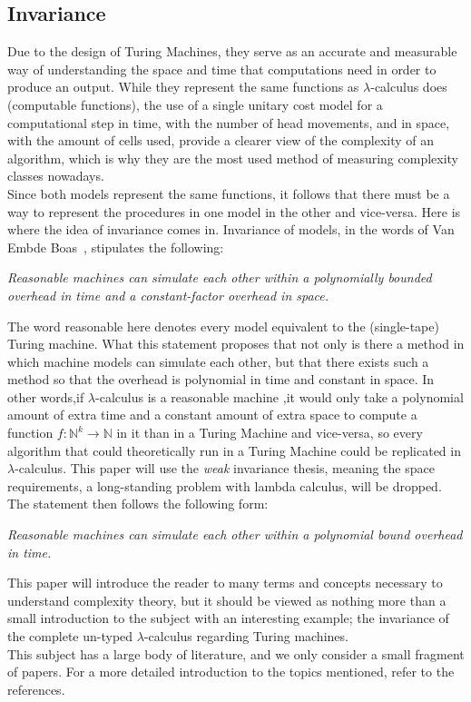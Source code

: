 \documentclass[11pt]{article}
\begin{document}
\subsection{Invariance}
Due to the design of Turing Machines, they serve as an accurate and measurable way of understanding the space and time that computations need in order to produce an output. While they represent the same functions as $\lambda$-calculus does (computable functions), the use of a single unitary cost model for a computational step in time, with the number of head movements, and in space, with the amount of cells used, provide a clearer view of the complexity of an algorithm, which is why they are the most used method of measuring complexity classes nowadays. \\
Since both models represent the same functions, it follows that there must be a way to represent the procedures in one model in the other and vice-versa. Here is where the idea of invariance comes in.
Invariance of models, in the words of Van Embde Boas~\cite{machine-models}, stipulates the following:
\begin{center}
 \textit{Reasonable machines can simulate each other within a polynomially
bounded overhead in time and a constant-factor overhead in space.}
\end{center}
The word reasonable here denotes every model equivalent to the (single-tape) Turing machine. What this statement proposes that not only is there a method in which machine models can simulate each other, but that there exists such a method so that the overhead is polynomial in time and constant in space. In other words,if $\lambda$-calculus is a reasonable machine ,it would only take a polynomial amount of extra time and a constant amount of extra space to compute a function $f : \mathbb{N}^k \rightarrow \mathbb{N}$ in it than in a Turing Machine and vice-versa, so every algorithm that could theoretically run in a Turing Machine could be replicated in $\lambda$-calculus.
This paper will use the \textit{weak} invariance thesis, meaning the space requirements, a long-standing problem with lambda calculus, will be dropped. The statement then follows the following form:
\begin{center}
 \textit{Reasonable machines can simulate each other within a polynomial
bound overhead in time.}
\end{center}

This paper will introduce the reader to many terms and concepts necessary to understand complexity theory, but it should be viewed as nothing more than a small introduction to the subject with an interesting example; the invariance of the complete un-typed $\lambda$-calculus regarding Turing machines. \\
This subject has a large body of literature, and we only consider a small fragment of papers. For a more detailed introduction to the topics mentioned, refer to the references.
\end{document}
